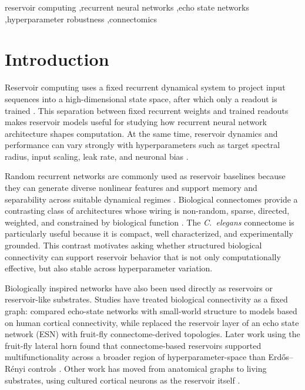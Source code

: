 \documentclass[a4paper,fleqn]{style_neural_networks/cas-dc}
\let\parencite\citep
\begin{document}
\begin{keywords}
reservoir computing \sep recurrent neural networks \sep echo state networks \sep hyperparameter robustness \sep connectomics
\end{keywords}

\maketitle

\section{Introduction}
Reservoir computing uses a fixed recurrent dynamical system to project input sequences into a high-dimensional state space, after which only a readout is trained \parencite{jaeger_echo_state_2001,maass_lsm_2002}. This separation between fixed recurrent weights and trained readouts makes reservoir models useful for studying how recurrent neural network architecture shapes computation. At the same time, reservoir dynamics and performance can vary strongly with hyperparameters such as target spectral radius, input scaling, leak rate, and neuronal bias \parencite{Lukosevicius2012PracticalESN,Matzner2022HyperparameterTuningESN}.

Random recurrent networks are commonly used as reservoir baselines because they can generate diverse nonlinear features and support memory and separability across suitable dynamical regimes \parencite{Lukosevicius2012PracticalESN}. Biological connectomes provide a contrasting class of architectures whose wiring is non-random, sparse, directed, weighted, and constrained by biological function \parencite{gabalda2018}. The \textit{C.\ elegans} connectome is particularly useful because it is compact, well characterized, and experimentally grounded. This contrast motivates asking whether structured biological connectivity can support reservoir behavior that is not only computationally effective, but also stable across hyperparameter variation.

Biologically inspired networks have also been used directly as reservoirs or reservoir-like substrates. Studies have treated biological connectivity as a fixed graph: \cite{KAWAI201915} compared echo-state networks with small-world structure to models based on human cortical connectivity, while \cite{morra_daley_2022} replaced the reservoir layer of an echo state network (ESN) with fruit-fly connectome-derived topologies. Later work using the fruit-fly lateral horn found that connectome-based reservoirs supported multifunctionality across a broader region of hyperparameter-space than Erd\H{o}s--R\'enyi controls \parencite{morra_fly_rc_2023}. Other work has moved from anatomical graphs to living substrates, using cultured cortical neurons as the reservoir itself \parencite{iannello_brc_2025}. 
\end{document}
